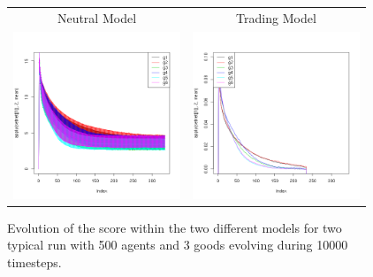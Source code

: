 \documentclass[a1paper,landscape,showframe,fontscale=.42]{baposter}
\begin{document}
\begin{poster}
{\begin{multicols}{2}
\begin{figure}[H]
	\centering
	\begin{tabular}{ c c}
		 Neutral Model & Trading Model \\
		 \includegraphics[width=5cm]{img/checkM.png}
		 & \includegraphics[width=5cm]{img/checkMDeriv.png}

	\end{tabular}
	\caption{Evolution of the score within the two different models for two typical run with 500 agents and 3 goods evolving during 10000 timesteps.}%
	\label{fig:scoreEvol}
\end{figure}


\end{multicols}}
\end{poster}
\end{document}
